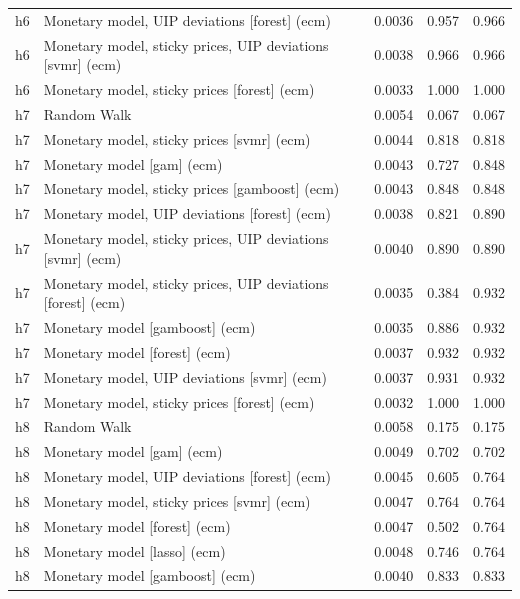 \begin{ThreePartTable}
\begin{longtable}[t]{cp{5.5cm}ccc}
h6 & \raggedright Monetary model, UIP deviations [forest] (ecm) & 0.0036 & 0.957 & 0.966\\
h6 & \raggedright Monetary model, sticky prices, UIP deviations [svmr] (ecm) & 0.0038 & 0.966 & 0.966\\
h6 & \raggedright Monetary model, sticky prices [forest] (ecm) & 0.0033 & 1.000 & 1.000\\
\addlinespace
h7 & \raggedright Random Walk & 0.0054 & 0.067 & 0.067\\
h7 & \raggedright Monetary model, sticky prices [svmr] (ecm) & 0.0044 & 0.818 & 0.818\\
h7 & \raggedright Monetary model [gam] (ecm) & 0.0043 & 0.727 & 0.848\\
h7 & \raggedright Monetary model, sticky prices [gamboost] (ecm) & 0.0043 & 0.848 & 0.848\\
h7 & \raggedright Monetary model, UIP deviations [forest] (ecm) & 0.0038 & 0.821 & 0.890\\
h7 & \raggedright Monetary model, sticky prices, UIP deviations [svmr] (ecm) & 0.0040 & 0.890 & 0.890\\
h7 & \raggedright Monetary model, sticky prices, UIP deviations [forest] (ecm) & 0.0035 & 0.384 & 0.932\\
h7 & \raggedright Monetary model [gamboost] (ecm) & 0.0035 & 0.886 & 0.932\\
h7 & \raggedright Monetary model [forest] (ecm) & 0.0037 & 0.932 & 0.932\\
h7 & \raggedright Monetary model, UIP deviations [svmr] (ecm) & 0.0037 & 0.931 & 0.932\\
h7 & \raggedright Monetary model, sticky prices [forest] (ecm) & 0.0032 & 1.000 & 1.000\\
\addlinespace
h8 & \raggedright Random Walk & 0.0058 & 0.175 & 0.175\\
h8 & \raggedright Monetary model [gam] (ecm) & 0.0049 & 0.702 & 0.702\\
h8 & \raggedright Monetary model, UIP deviations [forest] (ecm) & 0.0045 & 0.605 & 0.764\\
h8 & \raggedright Monetary model, sticky prices [svmr] (ecm) & 0.0047 & 0.764 & 0.764\\
h8 & \raggedright Monetary model [forest] (ecm) & 0.0047 & 0.502 & 0.764\\
h8 & \raggedright Monetary model [lasso] (ecm) & 0.0048 & 0.746 & 0.764\\
h8 & \raggedright Monetary model [gamboost] (ecm) & 0.0040 & 0.833 & 0.833\\

\end{longtable}
\end{ThreePartTable}
